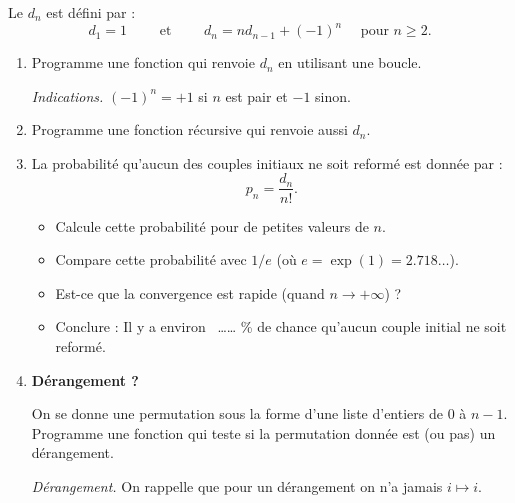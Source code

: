 \documentclass[11pt,class=report,crop=false]{standalone}
\begin{document}
\begin{activite}[Dérangements]
   



Le  $d_n$ est défini par :
$$d_1 = 1 \qquad \text{ et } \qquad d_n = nd_{n-1} + (-1)^n \quad \text{ pour } n\ge2.$$
\begin{enumerate}
  \item Programme une fonction  qui renvoie $d_n$ en utilisant une boucle.
  
  \emph{Indications.} $(-1)^n = + 1$ si $n$ est pair et $-1$ sinon.
    
  \item Programme une fonction récursive  qui renvoie aussi $d_n$.
  
  \item La probabilité qu'aucun des couples initiaux ne soit reformé est donnée par :
  $$p_n = \frac{d_n}{n!}.$$

   \begin{itemize}
     \item Calcule cette probabilité pour de petites valeurs de $n$.   
     \item Compare cette probabilité avec $1/e$ (où $e=\exp(1)=2.718\ldots$). 
     \item Est-ce que la convergence est rapide (quand $n\to+\infty$) ?
     \item Conclure : \og{}Il y a environ \ \ldots\ldots{} \%{} de chance qu'aucun couple initial ne soit reformé.\fg{}
    \end{itemize}
   
   \item \textbf{Dérangement ?} 
   
   On se donne une permutation sous la forme d'une liste d'entiers de $0$ à $n-1$.
   Programme une fonction  qui teste si la permutation donnée est (ou pas) un dérangement.
   
   \emph{Dérangement.} On rappelle que pour un dérangement on n'a jamais $i \mapsto i$. 
   

\end{enumerate}
\end{activite}
\end{document}
